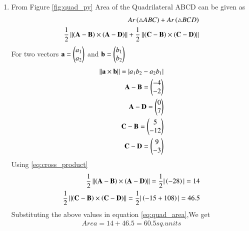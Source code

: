 \begin{enumerate}[label=\thesection.\arabic*.,ref=\thesection.\theenumi]
\item From Figure \ref{fig:quad_py} Area of the Quadrilateral ABCD can be given as
\begin{align}
Ar\left(\triangle ABC\right) + Ar\left(\triangle BCD\right)
\\
\frac{1}{2} \left\lVert\left(\mathbf{A}-\mathbf{B}\right)\times \left(\mathbf{A}-\mathbf{D}\right)\right\rVert + \frac{1}{2} \left\lVert{\ensuremath{\left(\mathbf{C}-\mathbf{B}\right)}} \times{\ensuremath{\left(\mathbf{C}-\mathbf{D}\right)}}\right\rVert
\label{eq:quad_area}
\end{align}
For two vectors $\mathbf{a} = \begin{pmatrix}a_1\\a_2\end{pmatrix}$ and $\mathbf{b} = \begin{pmatrix}b_1\\b_2\end{pmatrix}$
\begin{align}
\label{eq:cross_product}
\left\lVert\mathbf{a} \times \mathbf{b}\right\rVert = |a_1 b_2- a_2 b_1|
\\
\mathbf{A}-\mathbf{B} = \begin{pmatrix}-4\\-2\end{pmatrix}
\\
\mathbf{A}-\mathbf{D} = \begin{pmatrix}0\\7\end{pmatrix}
\\
\mathbf{C}-\mathbf{B} = \begin{pmatrix}5\\-12\end{pmatrix}
\\
\mathbf{C}-\mathbf{D} = \begin{pmatrix}9\\-3\end{pmatrix}
\end{align}
Using \ref{eq:cross_product}
\begin{align}
\frac{1}{2} \left\lVert\left(\mathbf{A}-\mathbf{B}\right)\times \left(\mathbf{A}-\mathbf{D}\right)\right\rVert = \frac{1}{2} |\left(-28\right)| =14
\\
\frac{1}{2} \left\lVert\left(\mathbf{C}-\mathbf{B}\right) \times \left(\mathbf{C}-\mathbf{D}\right)\right\rVert = \frac{1}{2} |\left(-15+108\right)|=46.5
\end{align}
Substituting the above values in equation \ref{eq:quad_area},We get
\begin{align}
Area = 14 + 46.5 = 60.5 sq.units
\end{align}
\end{enumerate}
